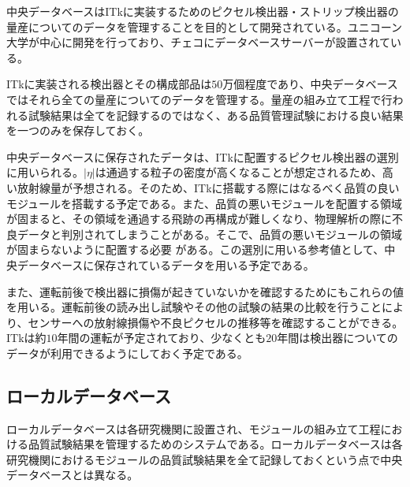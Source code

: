 中央データベースはITkに実装するためのピクセル検出器・ストリップ検出器の量産についてのデータを管理することを目的として開発されている。ユニコーン大学が中心に開発を行っており、チェコにデータベースサーバーが設置されている。

ITkに実装される検出器とその構成部品は$50$万個程度であり、中央データベースではそれら全ての量産についてのデータを管理する。量産の組み立て工程で行われる試験結果は全てを記録するのではなく、ある品質管理試験における良い結果を一つのみを保存しておく。

中央データベースに保存されたデータは、ITkに配置するピクセル検出器の選別に用いられる。$|\eta|$は通過する粒子の密度が高くなることが想定されるため、高い放射線量が予想される。そのため、ITkに搭載する際にはなるべく品質の良いモジュールを搭載する予定である。また、品質の悪いモジュールを配置する領域が固まると、その領域を通過する飛跡の再構成が難しくなり、物理解析の際に不良データと判別されてしまうことがある。そこで、品質の悪いモジュールの領域が固まらないように配置する必要
がある。この選別に用いる参考値として、中央データベースに保存されているデータを用いる予定である。

また、運転前後で検出器に損傷が起きていないかを確認するためにもこれらの値を用いる。運転前後の読み出し試験やその他の試験の結果の比較を行うことにより、センサーへの放射線損傷や不良ピクセルの推移等を確認することができる。
ITkは約$10$年間の運転が予定されており、少なくとも$20$年間は検出器についてのデータが利用できるようにしておく予定である。



\subsection{ローカルデータベース}
\label{sec:LocalDB}

ローカルデータベースは各研究機関に設置され、モジュールの組み立て工程における品質試験結果を管理するためのシステムである。ローカルデータベースは各研究機関におけるモジュールの品質試験結果を全て記録しておくという点で中央データベースとは異なる。

